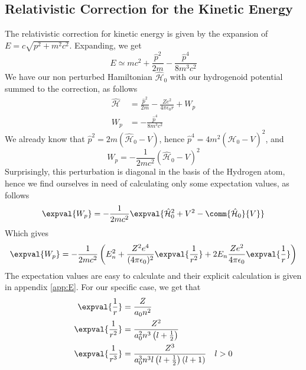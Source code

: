 \documentclass[a4paper, 11pt]{book}
\newcommand{\1}{\opr{\mathds{1}}}
\newcommand{\ham}{\mathcal{H}}
\newcommand{\opr}[1]{\hat{#1}}
\theoremstyle{plain}
\begin{document}
	\subsection{Relativistic Correction for the Kinetic Energy}
	The relativistic correction for kinetic energy is given by the expansion of $E=c\sqrt{p^2+m^2c^2}$. Expanding, we get
	\begin{equation}
		E\simeq mc^2+\frac{\opr{p}^2}{2m}-\frac{\opr{p}^4}{8m^3c^2}
		\label{eq:energypowerseries}
	\end{equation}
	We have our non perturbed Hamiltonian $\opr{\ham}_0$ with our hydrogenoid potential summed to the correction, as follows
	\begin{equation}
		\begin{aligned}
			\opr{\ham}&=\frac{\opr{p}^2}{2m}-\frac{Ze^2}{4\pi\epsilon_0r}+W_p\\
			W_p&=-\frac{\opr{p}^4}{8m^3c^2}
		\end{aligned}
		\label{eq:hampluspert}
	\end{equation}
	We already know that $\opr{p}^2=2m\left( \opr{\ham}_0-V \right)$, hence $\opr{p}^4=4m^2\left( \opr{\ham}_0-V \right)^2$, and
	\begin{equation*}
		W_p=-\frac{1}{2mc^2}\left( \opr{\ham}_0-V \right)^2
	\end{equation*}
	Surprisingly, this perturbation is diagonal in the basis of the Hydrogen atom, hence we find ourselves in need of calculating only some expectation values, as follows
	\begin{equation}
		\expval{W_p}=-\frac{1}{2mc^2}\expval{\opr{\ham}_0^2+V^2-\comm{\opr{\ham}_0}{V}}
		\label{eq:evaluationkineticcorr}
	\end{equation}
	Which gives
	\begin{equation}
		\expval{W_p}=-\frac{1}{2mc^2}\left( E_n^2+\frac{Z^2e^4}{(4\pi\epsilon_0)^2}\expval{\frac{1}{r^2}}+2E_n\frac{Ze^2}{4\pi\epsilon_0}\expval{\frac{1}{r}} \right)
		\label{eq:completecalc}
	\end{equation}
	The expectation values are easy to calculate and their explicit calculation is given in appendix \ref{app:E}. For our specific case, we get that
	\begin{equation}
		\begin{aligned}
			\expval{\frac{1}{r}}&=\frac{Z}{a_0n^2}\\
			\expval{\frac{1}{r^2}}&=\frac{Z^2}{a_0^2n^3\left( l+\frac{1}{2} \right)}\\
			\expval{\frac{1}{r^3}}&=\frac{Z^3}{a_0^3n^3l\left( l+\frac{1}{2} \right)\left( l+1 \right)}\quad l>0
		\end{aligned}
		\label{eq:expvalrminusk}
	\end{equation}
\end{document}
